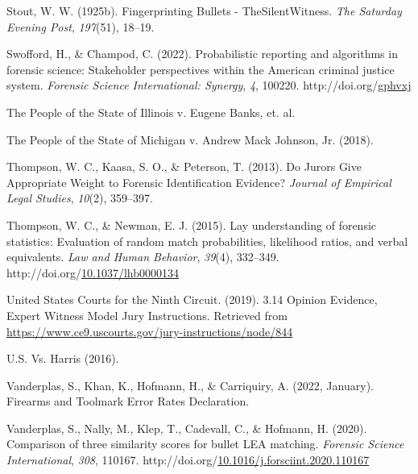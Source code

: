 \documentclass[print]{nuthesis}
\newlength{\cslhangindent}
\newenvironment{CSLReferences}[2]%
{\setlength{\parindent}{0pt}%
\everypar{\setlength{\hangindent}{\cslhangindent}}\ignorespaces}%
{\par}
\begin{document}
\begin{CSLReferences}{1}{0}
\leavevmode{}%
Stout, W. W. (1925b). {Fingerprinting} {Bullets} - {The}{Silent}{Witness}. \emph{The {Saturday} {Evening} {Post}}, \emph{197}(51), 18--19.

\leavevmode{}%
Swofford, H., \& Champod, C. (2022). Probabilistic reporting and algorithms in forensic science: {Stakeholder} perspectives within the {American} criminal justice system. \emph{Forensic Science International: Synergy}, \emph{4}, 100220. http://doi.org/\href{https://doi.org/gphvxj}{gphvxj}

\leavevmode{}%
The {People} of the {State} of {Illinois} v. Eugene {Banks}, et. al.

\leavevmode{}%
The {People} of the {State} of {Michigan} v. Andrew {Mack} {Johnson}, {Jr.} (2018).

\leavevmode{}%
Thompson, W. C., Kaasa, S. O., \& Peterson, T. (2013). Do {Jurors} {Give} {Appropriate} {Weight} to {Forensic} {Identification} {Evidence}? \emph{Journal of Empirical Legal Studies}, \emph{10}(2), 359--397.

\leavevmode{}%
Thompson, W. C., \& Newman, E. J. (2015). Lay understanding of forensic statistics: {Evaluation} of random match probabilities, likelihood ratios, and verbal equivalents. \emph{Law and Human Behavior}, \emph{39}(4), 332--349. http://doi.org/\href{https://doi.org/10.1037/lhb0000134}{10.1037/lhb0000134}

\leavevmode{}%
United States Courts for the Ninth Circuit. (2019). 3.14 {Opinion} {Evidence}, {Expert} {Witness} {\textbar} {Model} {Jury} {Instructions}. Retrieved from \url{https://www.ce9.uscourts.gov/jury-instructions/node/844}

\leavevmode{}%
{U.S.} Vs. {Harris} (2016).

\leavevmode{}%
Vanderplas, S., Khan, K., Hofmann, H., \& Carriquiry, A. (2022, January). Firearms and {Toolmark} {Error} {Rates} {Declaration}.

\leavevmode{}%
Vanderplas, S., Nally, M., Klep, T., Cadevall, C., \& Hofmann, H. (2020). Comparison of three similarity scores for bullet {LEA} matching. \emph{Forensic Science International}, \emph{308}, 110167. http://doi.org/\href{https://doi.org/10.1016/j.forsciint.2020.110167}{10.1016/j.forsciint.2020.110167}


\end{CSLReferences}
\end{document}
